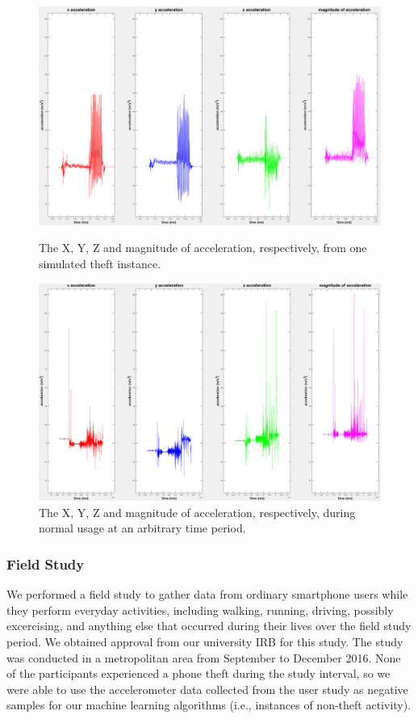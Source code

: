 \begin{figure}[t]
\includegraphics[width=1.0\columnwidth]{pos_acc_separated.png}
\caption{The X, Y, Z and magnitude of acceleration, respectively, from one simulated theft instance.}
\label{fig:simtheft}
\includegraphics[width=1.0\columnwidth]{neg_acc_separated.png}
\caption{The X, Y, Z and magnitude of acceleration, respectively, during normal usage at an arbitrary time period.}
\end{figure}




\subsubsection{Field Study}
We performed a field study to gather data from ordinary smartphone users while they perform everyday activities, including walking, running, driving, possibly excercising, and anything else that occurred during their lives over the field study period.
We obtained approval from our university IRB for this study. 
The study was conducted in a metropolitan area from September to December 2016.
None of the participants experienced a phone theft during the study interval,
so we were able to use the accelerometer data collected from the user study as negative samples for our machine learning algorithms (i.e., instances of non-theft activity).

